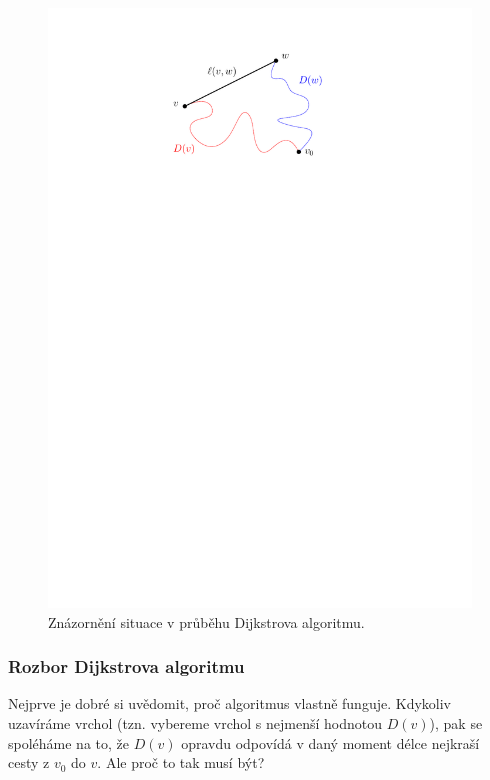 \begin{figure}[h]
    \centering
    \includegraphics[scale=\graphimgsize]{components/images/ch01_dijkstra_kratsi_cesta.pdf}
    \caption{Znázornění situace v průběhu Dijkstrova algoritmu.}
    \label{fig:dijkstra_kratsi_cesta}
\end{figure}

\subsubsection{Rozbor Dijkstrova algoritmu}

Nejprve je dobré si uvědomit, proč algoritmus vlastně funguje. Kdykoliv uzavíráme vrchol (tzn. vybereme vrchol s nejmenší hodnotou $D(v)$), pak se spoléháme na to, že $D(v)$ opravdu odpovídá v daný moment délce nejkraší cesty z $v_0$ do $v$. Ale proč to tak musí být?

